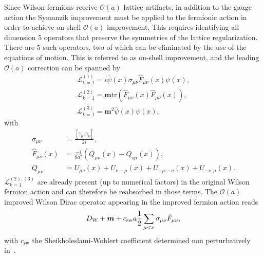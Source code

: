 Since Wilson fermions receive $\mathcal{O}(a)$ lattice artifacts, in addition to the gauge action the Symanzik improvement must be applied to the fermionic action in order 
to achieve on-shell $\mathcal{O}(a)$ improvement. This requires identifying all dimension $5$ operators that preserve the symmetries of the lattice regularization. There are 5 such operators, two of which can be eliminated by the use of the equations of motion. This is referred to as on-shell improvement, and the leading $\mathcal{O}(a)$ correction can be spanned by 
\begin{gather}
\label{ch_foundation:eq:L1}
\mathcal{L}_{k=1}^{(1)}=i\bar{\psi}(x)\sigma_{\mu\nu}\hat{F}_{\mu\nu}(x)\psi(x),\\
\mathcal{L}_{k=1}^{(2)}=\boldsymbol{m}{\textrm{tr}}\left(\hat{F}_{\mu\nu}(x)\hat{F}_{\mu\nu}(x)\right),\\
\mathcal{L}_{k=1}^{(3)}=\boldsymbol{m}^2\bar{\psi}(x)\psi(x),
\end{gather}
with
\begin{align}
\label{ch_foundation:eq:dim5-op}
\sigma_{\mu\nu}&=\frac{\left[\gamma_{\mu},\gamma_{\nu}\right]}{2i},\\
\label{ch_foundation:eq:F_clover}
\hat{F}_{\mu\nu}(x)&=\frac{-i}{8a^2}\left(Q_{\mu\nu}(x)-Q_{\nu\mu}(x)\right),\\
Q_{\mu\nu}&=U_{\mu\nu}(x)+U_{\nu,-\mu}(x)+U_{-\mu,-\nu}(x)+U_{-\nu,\mu}(x).
\end{align}
$\mathcal{L}_{k=1}^{(2),(3)}$ are already present (up to numerical factors) in the original Wilson fermion action and can therefore be reabsorbed in those terms. The $\mathcal{O}(a)$ improved Wilson Dirac operator appearing in the improved fermion action reads
\begin{equation}
\label{ch_foundation:eq:DW_impr}
D_{\textrm W}+\boldsymbol{m}+c_{\textrm{sw}}a\frac{1}{2}\sum_{\mu<\nu}\sigma_{\mu\nu}\hat{F}_{\mu\nu},
\end{equation}
with $c_{\textrm{sw}}$ the Sheikholeslami-Wohlert coefficient determined non perturbatively in~\citep{Sheikholeslami:1985ij}.

